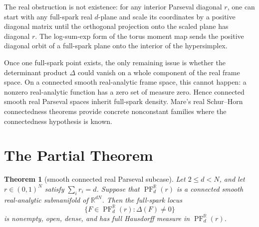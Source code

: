 \documentclass[11pt]{article}
\newtheorem{theorem}{Theorem}
\newcommand{\R}{\mathbb R}
\newcommand{\PF}{\operatorname{PF}}
\begin{document}
The real obstruction is not existence: for any interior Parseval diagonal \(r\), one can start with any full-spark real \(d\)-plane and scale its coordinates by a positive diagonal matrix until the orthogonal projection onto the scaled plane has diagonal \(r\). The log-sum-exp form of the torus moment map sends the positive diagonal orbit of a full-spark plane onto the interior of the hypersimplex.

Once one full-spark point exists, the only remaining issue is whether the determinant product \(\Delta\) could vanish on a whole component of the real frame space. On a connected smooth real-analytic frame space, this cannot happen: a nonzero real-analytic function has a zero set of measure zero. Hence connected smooth real Parseval spaces inherit full-spark density. Mare's real Schur--Horn connectedness theorems provide concrete nonconstant families where the connectedness hypothesis is known.

\section{The Partial Theorem}

\begin{theorem}[smooth connected real Parseval subcase]\label{thm:smooth-connected}
Let \(2\le d<N\), and let \(r\in(0,1)^N\) satisfy \(\sum_i r_i=d\). Suppose that \(\PF_d^{\R}(r)\) is a connected smooth real-analytic submanifold of \(\R^{dN}\). Then the full-spark locus
\[
 \{F\in\PF_d^{\R}(r): \Delta(F)\ne 0\}
\]
is nonempty, open, dense, and has full Hausdorff measure in \(\PF_d^{\R}(r)\).
\end{theorem}
\end{document}
